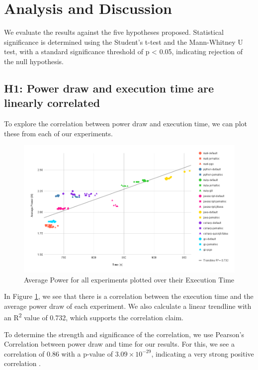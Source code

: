 \documentclass[main.tex]{subfiles}
\begin{document}
\section{Analysis and Discussion}

We evaluate the results against the five hypotheses proposed. Statistical significance is determined using the Student's t-test and the Mann-Whitney U test, with a standard significance threshold of p < 0.05, indicating rejection of the null hypothesis.

\subsection{H1: Power draw and execution time are linearly correlated}
To explore the correlation between power draw and execution time, we can plot these from each of our experiments. 

\begin{figure}[h]
    \centering
    \includegraphics[width=\linewidth]{media/analysis/AveragePowerOverTime.png}
    \caption{Average Power for all experiments plotted over their Execution Time}
    \label{fig:analysis-energy-time-correlation}
\end{figure}

In Figure \ref{fig:analysis-energy-time-correlation}, we see that there is a correlation between the execution time and the average power draw of each experiment. We also calculate a linear trendline with an R\textsuperscript{2} value of 0.732, which supports the correlation claim.

To determine the strength and significance of the correlation, we use Pearson's Correlation between power draw and time for our results. For this, we see a correlation of 0.86 with a p-value of $3.09\times 10^{-29}$, indicating a very strong positive correlation  \cite{pearson-correlation-table}.
\end{document}
